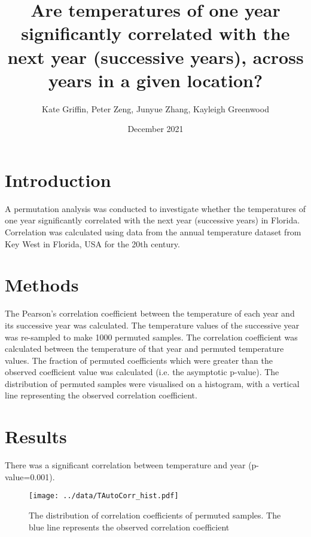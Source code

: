 \documentclass{article}
\title{Are temperatures of one year significantly correlated with the next year (successive years), across years in a given location?}
\author{Kate Griffin, Peter Zeng, Junyue Zhang, Kayleigh Greenwood}
\date{December 2021}
\begin{document}
	
	\maketitle
	
	\section{Introduction}
	A permutation analysis was conducted to investigate whether the temperatures of one year significantly correlated with the next year (successive years) in Florida. Correlation was calculated using data from the annual temperature dataset from Key West in Florida, USA for the 20th century. 
	
	\section{Methods}
	The Pearson's correlation coefficient between the temperature of each year and its successive year was calculated. The temperature values of the successive year was re-sampled to make 1000 permuted samples. The correlation coefficient was calculated between the temperature of that year and permuted temperature values. The fraction of permuted coefficients which were greater than the observed coefficient value was calculated (i.e. the asymptotic p-value). The distribution of permuted samples were visualised on a histogram, with a vertical line representing the observed correlation coefficient. 
	
	\section{Results} 
	There was a significant correlation between temperature and year (p-value=0.001). 
	\begin{figure}[H]
		\texttt{[image: ../data/TAutoCorr\_hist.pdf]}
		\caption{The distribution of correlation coefficients of permuted samples. The blue line represents the observed correlation coefficient}
		\label{The distribution of correlation coefficients of permuted samples. The blue line represents the observed correlation coefficient}
	\end{figure}
	
\end{document}
